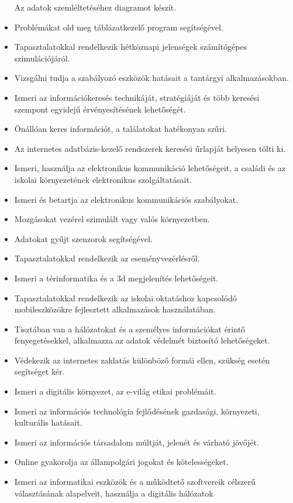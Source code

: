 \begin{itemize}
  Az adatok szemléltetéséhez diagramot készít.
\item
  Problémákat old meg táblázatkezelő program segítségével.
\item
  Tapasztalatokkal rendelkezik hétköznapi jelenségek számítógépes
  szimulációjáról.
\item
  Vizsgálni tudja a szabályozó eszközök hatásait a tantárgyi
  alkalmazásokban.
\item
  Ismeri az információkeresés technikáját, stratégiáját és több keresési
  szempont egyidejű érvényesítésének lehetőségét.
\item
  Önállóan keres információt, a találatokat hatékonyan szűri.
\item
  Az internetes adatbázis-kezelő rendszerek keresési űrlapját helyesen
  tölti ki.
\item
  Ismeri, használja az elektronikus kommunikáció lehetőségeit, a családi
  és az iskolai környezetének elektronikus szolgáltatásait.
\item
  Ismeri és betartja az elektronikus kommunikációs szabályokat.
\item
  Mozgásokat vezérel szimulált vagy valós környezetben.
\item
  Adatokat gyűjt szenzorok segítségével.
\item
  Tapasztalatokkal rendelkezik az eseményvezérlésről.
\item
  Ismeri a térinformatika és a 3d megjelenítés lehetőségeit.
\item
  Tapasztalatokkal rendelkezik az iskolai oktatáshoz kapcsolódó
  mobileszközökre fejlesztett alkalmazások használatában.
\item
  Tisztában van a hálózatokat és a személyes információkat érintő
  fenyegetésekkel, alkalmazza az adatok védelmét biztosító
  lehetőségeket.
\item
  Védekezik az internetes zaklatás különböző formái ellen, szükség
  esetén segítséget kér.
\item
  Ismeri a digitális környezet, az e-világ etikai problémáit.
\item
  Ismeri az információs technológia fejlődésének gazdasági, környezeti,
  kulturális hatásait.
\item
  Ismeri az információs társadalom múltját, jelenét és várható jövőjét.
\item
  Online gyakorolja az állampolgári jogokat és kötelességeket.
\item
  Ismeri az informatikai eszközök és a működtető szoftvereik célszerű
  választásának alapelveit, használja a digitális hálózatok

\end{itemize}

